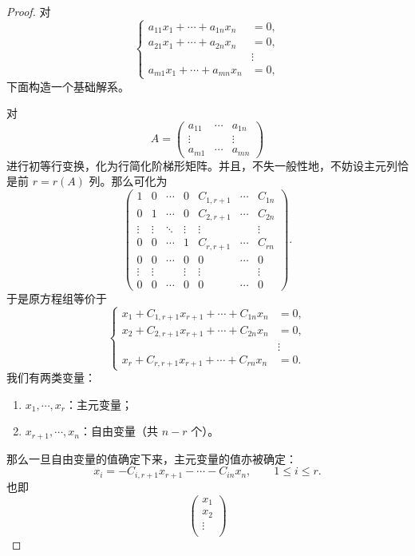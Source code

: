 \begin{proof}
	对
	\[
	\left\{
	\begin{aligned}
		a_{11}x_1+\cdots+a_{1n}x_n&=0,\\
		a_{21}x_1+\cdots+a_{2n}x_n&=0,\\
		&\vdots\\
		a_{m1}x_1+\cdots+a_{mn}x_n&=0,
	\end{aligned}
	\right.
	\]
	下面构造一个基础解系。
	
	对
	\[
	A=
	\begin{pmatrix}
		a_{11}&\cdots&a_{1n}\\
		\vdots&&\vdots\\
		a_{m1}&\cdots&a_{mn}
	\end{pmatrix}
	\]
	进行初等行变换，化为行简化阶梯形矩阵。并且，不失一般性地，不妨设主元列恰是前 $r=r(A)$ 列。那么可化为
	\[
	\begin{pmatrix}
		1&0&\cdots&0&C_{1,r+1}&\cdots&C_{1n}\\
		0&1&\cdots&0&C_{2,r+1}&\cdots&C_{2n}\\
		\vdots&\vdots&\ddots&\vdots&\vdots&&\vdots\\
		0&0&\cdots&1&C_{r,r+1}&\cdots&C_{rn}\\
		0&0&\cdots&0&0&\cdots&0\\
		\vdots&\vdots&&\vdots&\vdots&&\vdots\\
		0&0&\cdots&0&0&\cdots&0
	\end{pmatrix}.
	\]
	于是原方程组等价于
	\[
	\left\{
	\begin{aligned}
		x_1+C_{1,r+1}x_{r+1}+\cdots+C_{1n}x_n&=0,\\
		x_2+C_{2,r+1}x_{r+1}+\cdots+C_{2n}x_n&=0,\\
		&\vdots\\
		x_r+C_{r,r+1}x_{r+1}+\cdots+C_{rn}x_n&=0.
	\end{aligned}
	\right.
	\]
	我们有两类变量：
	\begin{enumerate}
		\item $x_1,\cdots,x_r$：主元变量；
		\item $x_{r+1},\cdots,x_n$：自由变量（共 $n-r$ 个）。
	\end{enumerate}
	那么一旦自由变量的值确定下来，主元变量的值亦被确定：
	\[
	x_i=-C_{i,r+1}x_{r+1}-\cdots-C_{in}x_n,
	\qquad 1\leq i\leq r.
	\]
	也即
	\begin{equation}\tag{1}
	\begin{pmatrix}
		x_1\\
		x_2\\
		\vdots\\

\end{pmatrix}
\end{equation}
\end{proof}

